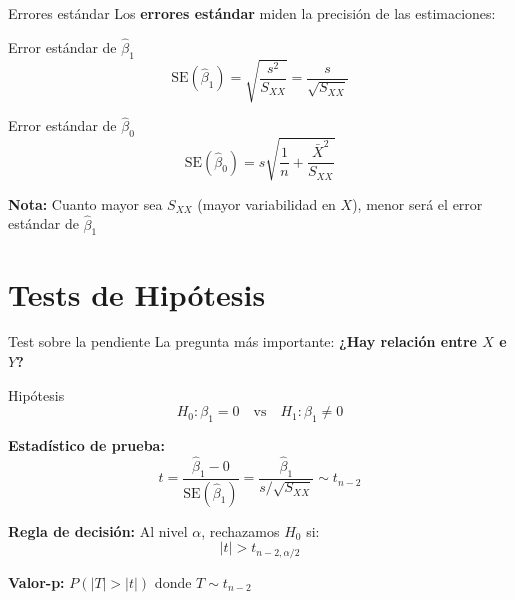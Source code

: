 \documentclass[aspectratio=169]{beamer}
\begin{document}
\begin{frame}{Errores estándar}
Los \textbf{errores estándar} miden la precisión de las estimaciones:

\begin{block}{Error estándar de $\hat{\beta}_1$}
\[
\text{SE}(\hat{\beta}_1) = \sqrt{\frac{s^2}{S_{XX}}} = \frac{s}{\sqrt{S_{XX}}}
\]
\end{block}

\begin{block}{Error estándar de $\hat{\beta}_0$}
\[
\text{SE}(\hat{\beta}_0) = s \sqrt{\frac{1}{n} + \frac{\bar{X}^2}{S_{XX}}}
\]
\end{block}

\vspace{0.3cm}
\textbf{Nota:} Cuanto mayor sea $S_{XX}$ (mayor variabilidad en $X$), menor será el error estándar de $\hat{\beta}_1$
\end{frame}

\section{Tests de Hipótesis}

\begin{frame}{Test sobre la pendiente}
La pregunta más importante: \textbf{¿Hay relación entre $X$ e $Y$?}

\begin{block}{Hipótesis}
\[
H_0: \beta_1 = 0 \quad \text{vs} \quad H_1: \beta_1 \neq 0
\]
\end{block}

\textbf{Estadístico de prueba:}
\[
t = \frac{\hat{\beta}_1 - 0}{\text{SE}(\hat{\beta}_1)} = \frac{\hat{\beta}_1}{s/\sqrt{S_{XX}}} \sim t_{n-2}
\]

\textbf{Regla de decisión:} Al nivel $\alpha$, rechazamos $H_0$ si:
\[
|t| > t_{n-2, \alpha/2}
\]

\textbf{Valor-p:} $P(|T| > |t|)$ donde $T \sim t_{n-2}$
\end{frame}
\end{document}
